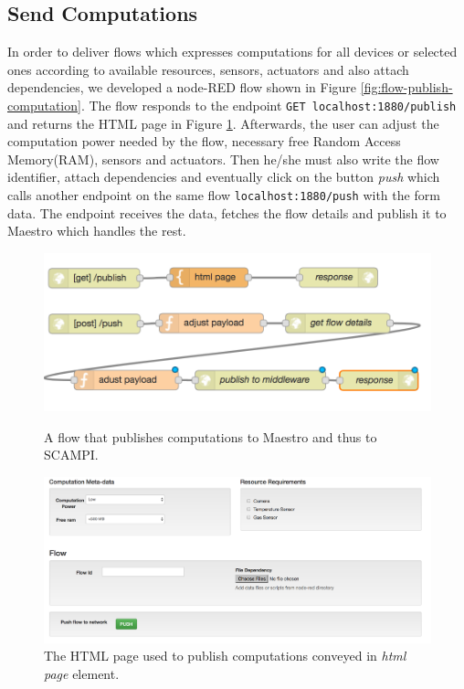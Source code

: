 \subsection{Send Computations}\label{subsec:send-comp}
In order to deliver flows which expresses computations for all devices or selected ones according to available resources,  sensors, actuators and also attach dependencies, we developed a node-RED flow shown in Figure \ref{fig:flow-publish-computation}. The flow responds to the endpoint \verb|GET localhost:1880/publish| and returns the HTML page in Figure \ref{fig:html-publish}. Afterwards, the user can adjust the computation power needed by the flow, necessary free Random Access Memory(RAM), sensors and actuators. Then he/she must also write the flow identifier, attach dependencies and eventually click on the button \textit{push} which calls another endpoint on the same flow \verb|localhost:1880/push| with the form data. The endpoint receives the data, fetches the flow details and publish it to  Maestro which handles the rest.
 \begin{figure}[H]
	\centering
	\includegraphics[scale=0.6]{images/flow-publish-computation.png}
	\caption{A flow that publishes computations to Maestro and thus to SCAMPI.}
	\label{fig:flow-publish-computation}
	\centering
	\includegraphics[scale=0.4]{images/html-publish.png}
	\caption{The HTML page used to publish computations conveyed in \textit{html page} element.}
	\label{fig:html-publish}
\end{figure}


